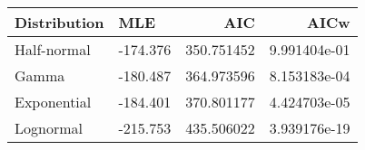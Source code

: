 \begin{tabular}{llrr}
\toprule
Distribution &      MLE &         AIC &          AICw \\
\midrule
 Half-normal & -174.376 &  350.751452 &  9.991404e-01 \\
       Gamma & -180.487 &  364.973596 &  8.153183e-04 \\
 Exponential & -184.401 &  370.801177 &  4.424703e-05 \\
   Lognormal & -215.753 &  435.506022 &  3.939176e-19 \\
\bottomrule
\end{tabular}
